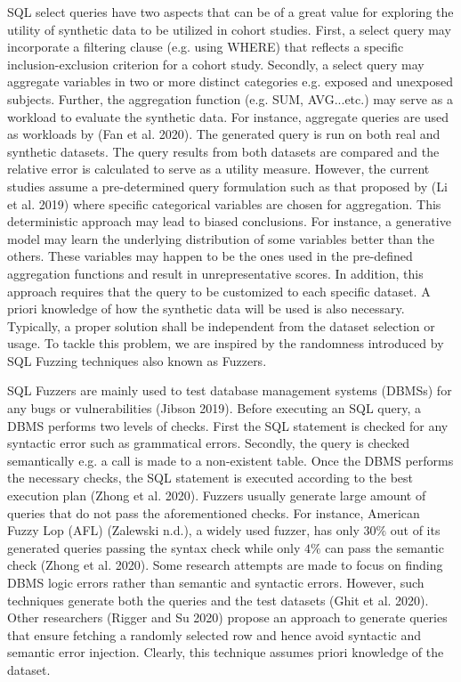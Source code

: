 \documentclass[10pt]{article}
\begin{document}
SQL select queries have two aspects that can be of a great value for exploring the utility of synthetic data to be utilized in cohort studies. First, a select query may incorporate a filtering clause (e.g. using WHERE) that reflects a specific inclusion-exclusion criterion for a cohort study. Secondly, a select query may aggregate variables in two or more distinct categories e.g. exposed and unexposed subjects. Further, the aggregation function (e.g. SUM, AVG...etc.) may serve as a workload to evaluate the synthetic data. For instance, aggregate queries are used as workloads by (Fan et al. 2020). The generated query is run on both real and synthetic datasets. The query results from both datasets are compared and the relative error is calculated to serve as a utility measure. However, the current studies assume a pre-determined query formulation such as that proposed by (Li et al. 2019) where specific categorical variables are chosen for aggregation. This deterministic approach may lead to biased conclusions. For instance, a generative model may learn the underlying distribution of some variables better than the others. These variables may happen to be the ones used in the pre-defined aggregation functions and result in unrepresentative scores. In addition, this approach requires that the query to be customized to each specific dataset. A priori knowledge of how the synthetic data will be used is also necessary. Typically, a proper solution shall be independent from the dataset selection or usage. To tackle this problem, we are inspired by the randomness introduced by SQL Fuzzing techniques also known as Fuzzers.

SQL Fuzzers are mainly used to test database management systems (DBMSs) for any bugs or vulnerabilities (Jibson 2019). Before executing an SQL query, a DBMS performs two levels of checks. First the SQL statement is checked for any syntactic error such as grammatical errors. Secondly, the query is checked semantically e.g. a call is made to a non-existent table. Once the DBMS performs the necessary checks, the SQL statement is executed according to the best execution plan (Zhong et al. 2020). Fuzzers usually generate large amount of queries that do not pass the aforementioned checks. For instance, American Fuzzy Lop (AFL) (Zalewski n.d.), a widely used fuzzer, has only $30 \%$ out of its generated queries passing the syntax check while only $4 \%$ can pass the semantic check (Zhong et al. 2020). Some research attempts are made to focus on finding DBMS logic errors rather than semantic and syntactic errors. However, such techniques generate both the queries and the test datasets (Ghit et al. 2020). Other researchers (Rigger and Su 2020) propose an approach to generate queries that ensure fetching a randomly selected row and hence avoid syntactic and semantic error injection. Clearly, this technique assumes priori knowledge of the dataset.
\end{document}
